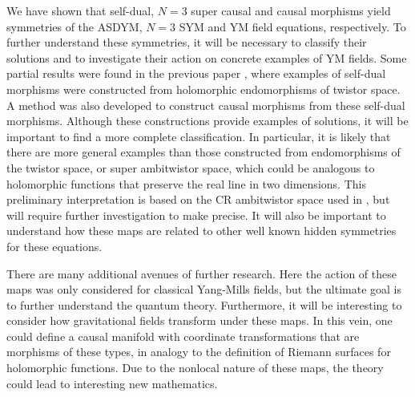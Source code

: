 \documentclass[12pt]{article}
\begin{document}
We have shown that self-dual, $N=3$ super causal and causal morphisms yield  symmetries of the ASDYM, $N=3$ SYM and YM field equations, respectively.  To further understand these symmetries, it will be necessary to classify their solutions and to investigate their action on concrete examples of YM fields.  Some partial results were found in the previous paper \cite{https://doi.org/10.48550/arxiv.2203.07952}, where examples of self-dual morphisms were constructed from holomorphic endomorphisms of twistor space.  A method was also developed to construct causal morphisms from these self-dual morphisms.  Although these constructions provide examples of solutions, it will be important to find a more complete classification.  In particular, it is likely that there are more general examples than those constructed from endomorphisms of the twistor space, or super ambitwistor space, which could be analogous to holomorphic functions that preserve the real line in two dimensions. This preliminary interpretation is based on the CR ambitwistor space used in \cite{Mason_2006}, but will require further investigation to make precise. It will also be important to understand how these maps are related to other well known hidden symmetries for these equations.

There are many additional avenues of further research.  Here the action of these maps was only considered for classical Yang-Mills fields, but the ultimate goal is to further understand the quantum theory.  Furthermore, it will be interesting to consider how gravitational fields transform under these maps.  In this vein, one could define a causal manifold with coordinate transformations that are morphisms of these types, in analogy to the definition of Riemann surfaces for holomorphic functions.  Due to the nonlocal nature of these maps,  the theory could lead to interesting new mathematics.  








\end{document}
